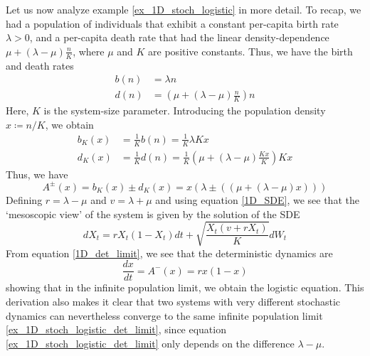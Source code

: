 Let us now analyze example \ref{ex_1D_stoch_logistic} in more detail. To recap, we had a population of individuals that exhibit a constant per-capita birth rate $\lambda > 0$, and a per-capita death rate that had the linear density-dependence $\mu + (\lambda-\mu)\frac{n}{K}$, where $\mu$ and $K$ are positive constants. Thus, we have the birth and death rates
\begin{equation}
	\label{ex_1D_stoch_logistic_BD_eqns}
	\begin{aligned}
		b(n) &= \lambda n\\
		d(n) &= \left(\mu + (\lambda-\mu)\frac{n}{K}\right)n
	\end{aligned}
\end{equation}
Here, $K$ is the system-size parameter. Introducing the population density $x\coloneqq n/K$, we obtain
\begin{align*}
	b_K(x) &= \frac{1}{K}b(n) = \frac{1}{K}\lambda Kx\\
	d_K(x) &= \frac{1}{K}d(n) = \frac{1}{K}\left(\mu + (\lambda-\mu)\frac{Kx}{K}\right)Kx
\end{align*}
Thus, we have
\begin{equation*}
	A^{\pm}(x) = b_K(x)\pm d_K(x) = x\left(\lambda \pm \left(\left(\mu + (\lambda-\mu)x\right)\right) \right)
\end{equation*}
Defining $r=\lambda-\mu$ and $v=\lambda+\mu$ and using equation \eqref{1D_SDE}, we 
see that the `mesoscopic view' of the system is given by the solution of the SDE
\begin{equation}\label{ex_1D_stoch_logistic_full_SDE}
	dX_t =  rX_t(1-X_t)dt + \sqrt{\frac{X_t(v+rX_t)}{K}}dW_t
\end{equation}
From equation \eqref{1D_det_limit}, we see that the deterministic dynamics are
\begin{equation}\label{ex_1D_stoch_logistic_det_limit}
	\frac{dx}{dt} = A^-(x) = rx(1-x)
\end{equation}
showing that in the infinite population limit, we obtain the logistic equation. This derivation also makes it clear that two systems with very different stochastic dynamics can nevertheless converge to the same infinite population limit \eqref{ex_1D_stoch_logistic_det_limit}, since equation \eqref{ex_1D_stoch_logistic_det_limit} only depends on the difference $\lambda-\mu$.
